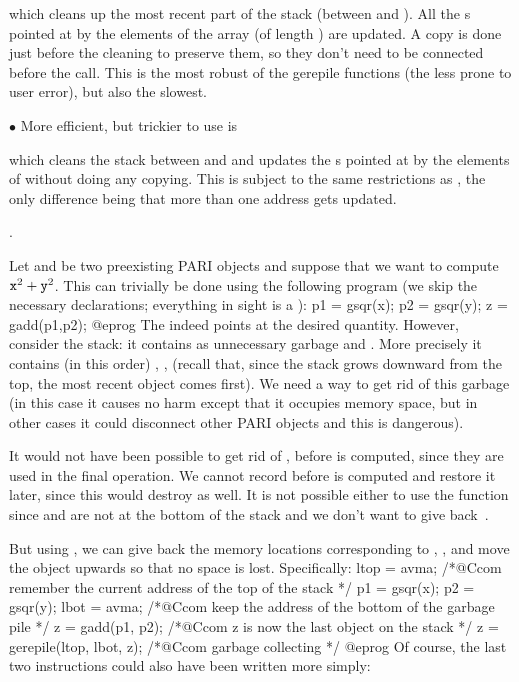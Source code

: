 \noindent which cleans up the most recent part of the stack (between
 and ). All the s pointed at by the elements of
the array  (of length ) are updated. A copy is done just
before the cleaning to preserve them, so they don't need to be connected
before the call. This is the most robust of the gerepile functions (the less
prone to user error), but also the slowest.

\noindent$\bullet$ More efficient, but trickier to use is


\noindent which cleans the stack between  and  and
updates the s pointed at by the elements of  without doing
any copying. This is subject to the same restrictions as , the
only difference being that more than one address gets updated.

.

\noindent
Let  and  be two preexisting PARI objects and suppose that we
want to compute ${\tt x}^2+ {\tt y}^2$. This can trivially be done using the
following program (we skip the necessary declarations; everything in sight is
a ):
\bprog
p1 = gsqr(x);
p2 = gsqr(y); z = gadd(p1,p2);
@eprog\noindent
The   indeed points at the desired quantity. However,
consider the stack: it contains as unnecessary garbage  and .
More precisely it contains (in this order) , , 
(recall that, since the stack grows downward from the top, the most recent
object comes first). We need a way to get rid of this garbage (in this case
it causes no harm except that it occupies memory space, but in other cases
it could disconnect other PARI objects and this is dangerous).

It would not have been possible to get rid of ,  before
 is computed, since they are used in the final operation. We cannot
record  before  is computed and restore it later, since
this would destroy  as well. It is not possible either to use the
function  since  and  are not at the bottom of the
stack and we don't want to give back~.

But using , we can give back the memory locations corresponding
to , , and move the object  upwards so that no
space is lost. Specifically:
\bprog
  ltop = avma; /*@Ccom remember the current address of the top of the stack */
  p1 = gsqr(x); p2 = gsqr(y);
  lbot = avma; /*@Ccom keep the address of the bottom of the garbage pile */
  z = gadd(p1, p2); /*@Ccom z is now the last object on the stack */
  z = gerepile(ltop, lbot, z); /*@Ccom garbage collecting */
@eprog
\noindent Of course, the last two instructions could also have been
written more simply:

